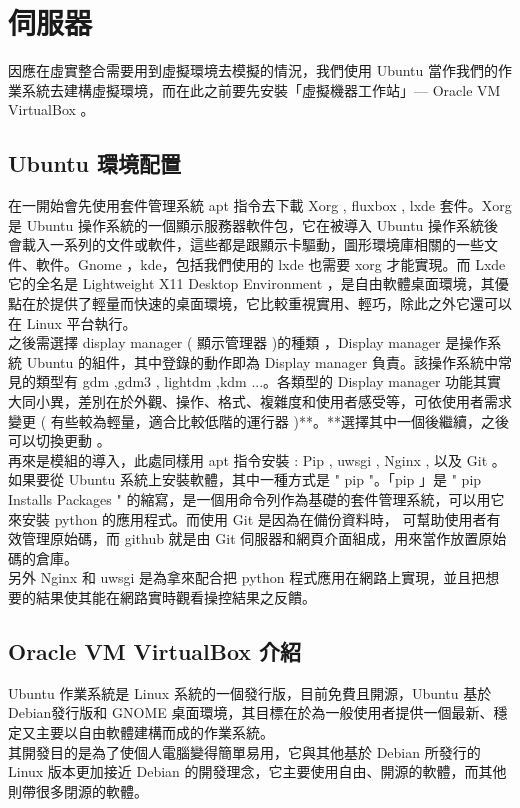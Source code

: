 \documentclass[14pt,a4paper]{report}  %
\begin{document}
\chapter{伺服器}
 因應在虛實整合需要用到虛擬環境去模擬的情況，我們使用 Ubuntu 當作我們的作業系統去建構虛擬環境，而在此之前要先安裝「虛擬機器工作站」— Oracle VM VirtualBox 。\\
\section{Ubuntu 環境配置}
 在一開始會先使用套件管理系統 apt 指令去下載 Xorg , fluxbox , lxde 套件。Xorg 是 Ubuntu 操作系統的一個顯示服務器軟件包，它在被導入 Ubuntu 操作系統後會載入一系列的文件或軟件，這些都是跟顯示卡驅動，圖形環境庫相關的一些文件、軟件。Gnome ，kde，包括我們使用的 lxde 也需要 xorg 才能實現。而 Lxde 它的全名是 Lightweight X11 Desktop Environment ，是自由軟體桌面環境，其優點在於提供了輕量而快速的桌面環境，它比較重視實用、輕巧，除此之外它還可以在 Linux 平台執行。\\
 
之後需選擇 display manager ( 顯示管理器 )的種類 ，Display manager 是操作系統 Ubuntu 的組件，其中登錄的動作即為 Display manager 負責。該操作系統中常見的類型有 gdm ,gdm3 , lightdm ,kdm ...。各類型的 Display manager 功能其實大同小異，差別在於外觀、操作、格式、複雜度和使用者感受等，可依使用者需求變更 ( 有些較為輕量，適合比較低階的運行器 )**。**選擇其中一個後繼續，之後可以切換更動 。\\

 再來是模組的導入，此處同樣用 apt 指令安裝 : Pip , uwsgi , Nginx  , 以及 Git 。如果要從 Ubuntu 系統上安裝軟體，其中一種方式是 " pip "。「pip 」是 " pip Installs Packages " 的縮寫，是一個用命令列作為基礎的套件管理系統，可以用它來安裝 python 的應用程式。而使用 Git 是因為在備份資料時， 可幫助使用者有效管理原始碼，而 github 就是由 Git 伺服器和網頁介面組成，用來當作放置原始碼的倉庫。\\
 另外 Nginx 和 uwsgi 是為拿來配合把 python 程式應用在網路上實現，並且把想要的結果使其能在網路實時觀看操控結果之反饋。
\section{Oracle VM VirtualBox 介紹}
 Ubuntu 作業系統是 Linux 系統的一個發行版，目前免費且開源，Ubuntu 基於 Debian發行版和 GNOME 桌面環境，其目標在於為一般使用者提供一個最新、穩定又主要以自由軟體建構而成的作業系統。\\
 
 其開發目的是為了使個人電腦變得簡單易用，它與其他基於 Debian 所發行的 Linux 版本更加接近 Debian 的開發理念，它主要使用自由、開源的軟體，而其他則帶很多閉源的軟體。\\
 
\end{document}
